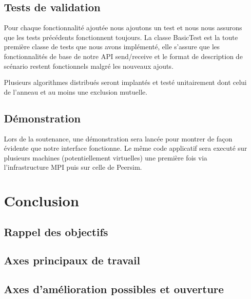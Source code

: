 \documentclass{article}
\begin{document}
		\subsection{Tests de validation}
		Pour chaque fonctionnalité ajoutée nous ajoutons un test et nous nous assurons que les tests précédents fonctionnent toujours.
		\newline
		La classe BasicTest est la toute première classe de tests que nous avons implémenté, elle s'assure que les fonctionnalités de base de notre API
		send/receive et le format de description de scénario restent fonctionnels malgré les nouveaux ajouts.

		Plusieurs algorithmes distribués seront implantés et testé unitairement dont celui de l'anneau et au moins une exclusion mutuelle.
		\subsection{Démonstration}
		Lors de la soutenance, une démonstration sera lancée pour montrer de façon évidente que notre interface fonctionne.
		Le même code applicatif sera executé sur plusieurs machines (potentiellement virtuelles) une première fois via l'infrastructure MPI puis sur celle de Peersim.
		
		\newpage
		\section{Conclusion}
		\subsection{Rappel des objectifs}
		\subsection{Axes principaux de travail}
		\subsection{Axes d'amélioration possibles et ouverture}
		
		
\end{document}
